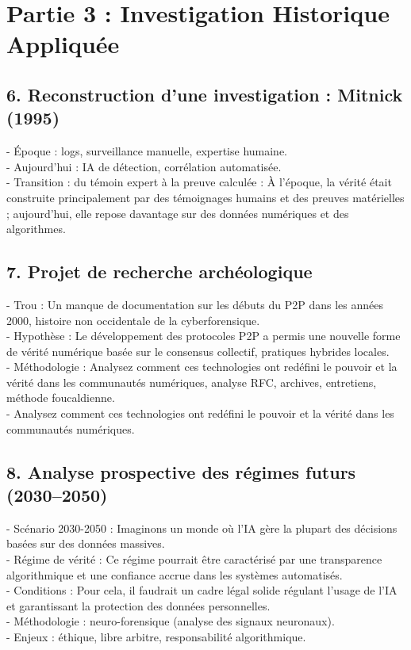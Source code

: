 \documentclass[french]{article}
\begin{document}
\section{Partie 3 : Investigation Historique Appliquée}
\subsection*{6.	Reconstruction d’une investigation : Mitnick (1995)}
-	Époque : logs, surveillance manuelle, expertise humaine.\\
-	Aujourd’hui : IA de détection, corrélation automatisée.\\
-	Transition : du témoin expert à la preuve calculée : À l'époque, la vérité était construite principalement par des témoignages humains et des preuves matérielles ; aujourd'hui, elle repose davantage sur des données numériques et des algorithmes.\\
\subsection*{7.	Projet de recherche archéologique}
-	Trou : Un manque de documentation sur les débuts du P2P dans les années 2000, histoire non occidentale de la cyberforensique.\\
-	Hypothèse : Le développement des protocoles P2P a permis une nouvelle forme de vérité numérique basée sur le consensus collectif, pratiques hybrides locales.\\
-	Méthodologie : Analysez comment ces technologies ont redéfini le pouvoir et la vérité dans les communautés numériques, analyse RFC, archives, entretiens, méthode foucaldienne.\\
-	Analysez comment ces technologies ont redéfini le pouvoir et la vérité dans les communautés numériques.\\
\subsection*{8.	Analyse prospective des régimes futurs (2030–2050)}
-	Scénario 2030-2050 : Imaginons un monde où l'IA gère la plupart des décisions basées sur des données massives.\\
-	Régime de vérité : Ce régime pourrait être caractérisé par une transparence algorithmique et une confiance accrue dans les systèmes automatisés.\\
-	Conditions : Pour cela, il faudrait un cadre légal solide régulant l'usage de l'IA et garantissant la protection des données personnelles.\\
-	Méthodologie : neuro-forensique (analyse des signaux neuronaux).\\
-	Enjeux : éthique, libre arbitre, responsabilité algorithmique.\\
\end{document}
